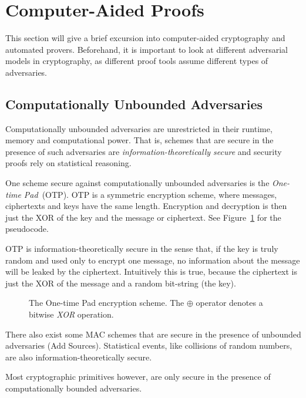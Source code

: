 \section{Computer-Aided Proofs}

This section will give a brief excursion into computer-aided cryptography and automated provers.
Beforehand, it is important to look at different adversarial models in cryptography, as different proof tools assume different types of adversaries.

\subsection{Computationally Unbounded Adversaries}
Computationally unbounded adversaries are unrestricted in their runtime, memory and computational power.
That is, schemes that are secure in the presence of such adversaries are \emph{information-theoretically secure}
and security proofs rely on statistical reasoning.

One scheme secure against computationally unbounded adversaries is the \emph{One-time Pad}~(OTP).
OTP is a symmetric encryption scheme, where messages, ciphertexts and keys have the same length.
Encryption and decryption is then just the XOR of the key and the message or ciphertext.
See Figure~\ref{fig:otp} for the pseudocode.

OTP is information-theoretically secure in the sense that, if the key is truly random and used only to encrypt one message,
no information about the message will be leaked by the ciphertext.
Intuitively this is true, because the ciphertext is just the XOR of the message and a random bit-string (the key).

\begin{figure}[!ht]
    \centering
    \nicoresetlinenr%
    \fbox{%
        \scalebox{\codescalefactor}{%
        }%
    }
    \caption{%
        The One-time Pad encryption scheme. The $\oplus$ operator denotes a bitwise \emph{XOR} operation.
    }
    \label{fig:otp}
\end{figure}

There also exist some MAC schemes that are secure in the presence of unbounded adversaries (\alert{Add Sources}).
Statistical events, like collisions of random numbers, are also information-theoretically secure.

Most cryptographic primitives however, are only secure in the presence of computationally bounded adversaries.

